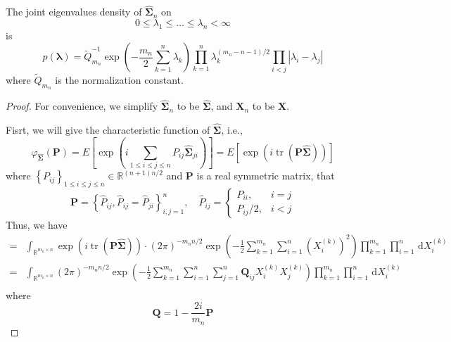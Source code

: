 \begin{theorem}
    The joint eigenvalues density of $\widehat{\boldsymbol{\Sigma}}_{n}$ on
    \begin{equation*}
        0\leq\lambda_{1}\leq\ldots\leq\lambda_{n}<\infty
    \end{equation*}
    is
    \begin{equation}
        p\left(\boldsymbol{\lambda}\right)=\widetilde{Q}_{m_{n}}^{-1}\exp\left(-\frac{m_{n}}{2}\sum_{k=1}^{n}\lambda_{k}\right)\prod_{k=1}^{n}\lambda_{k}^{(m_{n}-n-1)/2}\prod_{i<j}\left|\lambda_{i}-\lambda_{j}\right|
        \label{eq:joint-pdf-eigenvalues-sigma_n}
    \end{equation}
    where $\widetilde{Q}_{m_{n}}$ is the normalization constant.
\end{theorem}
\begin{proof}
    For convenience, we simplify $\widehat{\boldsymbol{\Sigma}}_{n}$  to be $\widehat{\boldsymbol{\Sigma}}$, and $\mathbf{X}_{n}$ to be $\mathbf{X}$.

    Fisrt, we will give the characteristic function of $\widehat{\boldsymbol{\Sigma}}$, i.e.,
    \begin{equation*}
        \varphi_{\widehat{\boldsymbol{\Sigma}}}\left(\mathbf{P}\right)=E\left[\exp\left(i\sum_{1\leq i\leq j\leq n}P_{ij}\widehat{\boldsymbol{\Sigma}}_{ji}\right)\right]=E\left[\exp\left(i\operatorname{tr}\left(\mathbf{P}\widehat{\boldsymbol{\Sigma}}\right)\right)\right]
    \end{equation*}
    where $\left\{P_{ij}\right\}_{1\leq i\leq j\leq n}\in\mathbb{R}^{(n+1)n/2}$ and $\mathbf{P}$ is a real symmetric matrix, that
    \begin{equation*}
        \mathbf{P}=\left\{\widehat{P}_{ij},\widehat{P}_{ij}=\widehat{P}_{ji}\right\}_{i,j=1}^{n},\quad\widehat{P}_{ij}=\begin{cases}P_{ii}, & i=j \\ P_{ij} / 2, & i<j \end{cases}
    \end{equation*}
    Thus, we have
    \begin{equation*}
        \begin{aligned}
            = & \int_{\mathbb{R}^{m_{n}\times n}}\exp\left(i\operatorname{tr}\left(\mathbf{P}\widehat{\boldsymbol{\Sigma}}\right)\right)\cdot(2\pi)^{-m_{n}n/2}\exp\left(-\frac{1}{2}\sum_{k=1}^{m_{n}}\sum_{i=1}^{n}\left(X_{i}^{(k)}\right)^{2}\right)\prod_{k=1}^{m_{n}}\prod_{i=1}^{n}\,\mathrm{d}X_{i}^{(k)} \\
            = & \int_{\mathbb{R}^{m_{n}\times n}}(2\pi)^{-m_{n}n/2}\exp\left(-\frac{1}{2}\sum_{k=1}^{m_{n}}\sum_{i=1}^{n}\sum_{j=1}^{n}\mathbf{Q}_{ij}X_{i}^{(k)}X_{j}^{(k)}\right)\prod_{k=1}^{m_{n}}\prod_{i=1}^{n}\,\mathrm{d}X_{i}^{(k)}                                                                      \\
        \end{aligned}
    \end{equation*}
    where
    \begin{equation*}
        \mathbf{Q}=1-\frac{2i}{m_{n}}\mathbf{P}
    \end{equation*}


\end{proof}
